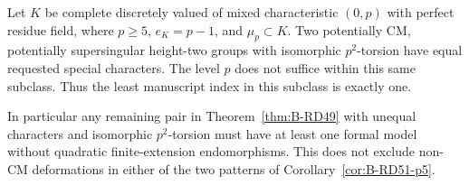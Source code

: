 \begin{theorem}
\label{thm:B-RD52}
Let $K$ be complete discretely valued of mixed characteristic
$(0,p)$ with perfect residue field, where $p\geq5$,
$e_K=p-1$, and $\mu_p\subset K$. Two
potentially CM, potentially supersingular height-two groups
with isomorphic $p^2$-torsion have equal requested special
characters. The level $p$ does not suffice within this same
subclass. Thus the least manuscript index in this subclass
is exactly one.

In particular any remaining pair in Theorem~\ref{thm:B-RD49}
with unequal characters and isomorphic $p^2$-torsion must
have at least one formal model without quadratic
finite-extension endomorphisms. This does not exclude
non-CM deformations in either of the two patterns of
Corollary~\ref{cor:B-RD51-p5}.
\end{theorem}
